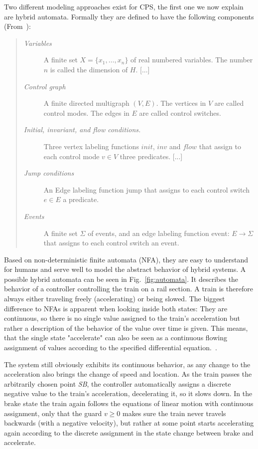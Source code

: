 Two different modeling approaches exist for CPS, the first one we now explain are hybrid automata. Formally they are defined to have the following components (From~\cite{Heinzinger2000b}):
\begin{quote}
		\begin{description}
			\item[\textit{Variables}]A finite set \(X = \{x_1,\dots , x_n\}\) of real numbered variables. The number \(n\) is called the dimension of \(H\). [...]
			\item[\textit{Control graph}]A finite directed multigraph \((V, E)\). The vertices in \(V\) are called control modes. The edges in \(E\) are called control switches.
			\item[\textit{Initial, invariant, and flow conditions.}]Three vertex labeling functions \(init\), \(inv\) and \(flow\) that assign to each control mode \(v\in V\) three predicates. [...]
			\item[\textit{Jump conditions}]An Edge labeling function jump that assigns to each control switch  \(e \in E\) a predicate.
			\item[\textit{Events}]A finite set \(\Sigma\) of events, and an edge labeling function event: \(E \rightarrow \Sigma\) that assigns to each control switch an event.
		\end{description}
\end{quote} 

Based on non-deterministic finite automata (NFA), they are easy to understand for humans and serve well to model the abstract behavior of hybrid systems. A possible hybrid automata can be seen in Fig.~\ref{fig:automata}. It describes the behavior of a controller controlling the train on a rail section. A train is therefore always either traveling freely (accelerating)  or being slowed. The biggest difference to NFAs is apparent when looking inside both states: They are continuous, so there is no single value assigned to the train's acceleration but rather a description of the behavior of the value over time is given. This means, that the single state "accelerate" can also be seen as a continuous flowing assignment of values according to the specified differential equation.~\cite{platzer2010b}.

The system still obviously exhibits its continuous behavior, as any change to the acceleration also brings the change of speed and location. As the train passes the arbitrarily chosen point \emph{SB}, the controller automatically assigns a discrete negative value to the train's acceleration, decelerating it, so it slows down. In the brake state the train again follows the equations of linear motion with continuous assignment, only that the guard \(v \geq 0\) makes sure the train never travels backwards (with a negative velocity), but rather at some point starts accelerating again according to the discrete assignment in the state change between brake and accelerate.

